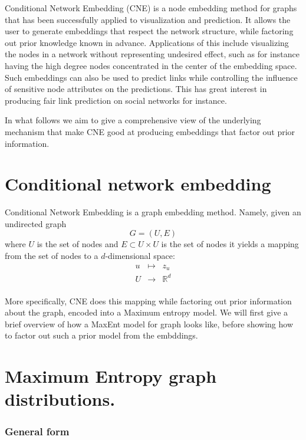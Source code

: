 Conditional Network Embedding (CNE) is a node embedding method for
graphs that has been successfully applied to visualization and
prediction. It allows the user to generate embeddings that respect the
network structure, while factoring out prior knowledge known in advance.
Applications of this include visualizing the nodes in a network without
representing undesired effect, such as for instance having the high
degree nodes concentrated in the center of the embedding space. Such
embeddings can also be used to predict links while controlling the
influence of sensitive node attributes on the predictions. This has
great interest in producing fair link prediction on social networks for
instance.

In what follows we aim to give a comprehensive view of the underlying
mechanism that make CNE good at producing embeddings that factor out
prior information.

\hypertarget{conditional-network-embedding}{%
\section{Conditional network
embedding}\label{conditional-network-embedding}}

Conditional Network Embedding is a graph embedding method. Namely, given
an undirected graph \[G=(U,E)\] where \(U\) is the set of nodes and
\(E\subset U\times U\) is the set of nodes it yields a mapping from the
set of nodes to a \(d\)-dimensional space: \[
\begin{aligned}
u &\mapsto   &z_u \\
U &\rightarrow  &\mathbb{R}^d \\
\end{aligned}
\]

More specifically, CNE does this mapping while factoring out prior
information about the graph, encoded into a Maximum entropy model. We
will first give a brief overview of how a MaxEnt model for graph looks
like, before showing how to factor out such a prior model from the
embddings.

\hypertarget{maximum-entropy-graph-distributions.}{%
\section{Maximum Entropy graph
distributions.}\label{maximum-entropy-graph-distributions.}}

\hypertarget{general-form}{%
\subsubsection{General form}\label{general-form}}

